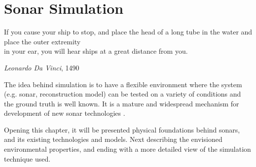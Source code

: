 \chapter{Sonar Simulation}

\epigraph{If you cause your ship to stop, and place the head of a long tube in
the water and place the outer extremity\\ in your ear, you will hear ships at a
great distance from you.}{\textit{Leonardo Da Vinci}, 1490}


The idea behind simulation is to have a flexible environment where the system
(e.g. sonar, reconstruction model) can be tested on a variety of conditions
and the ground truth is well known. It is a mature and widespread
mechanism for development of new sonar technologies \cite{Etter2013}.

Opening this chapter, it will be presented physical foundations behind sonars,
and its existing technologies and models. Next describing the envisioned
environmental properties, and ending  with  a more detailed view of the
simulation technique used.





